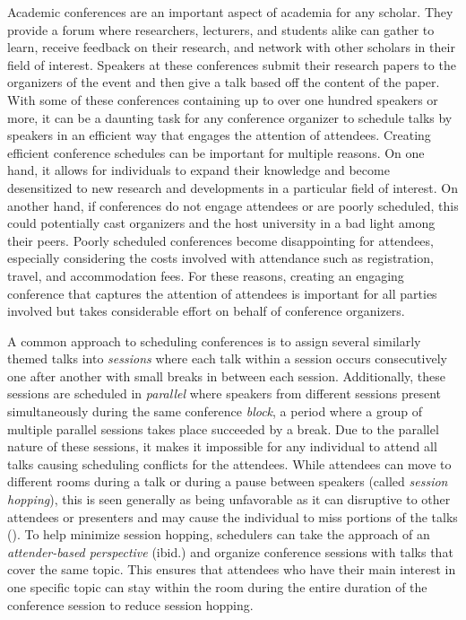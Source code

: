 \documentclass[a4paper, 12pt, twoside]{article}
\numberwithin{equation}{section} %
\begin{document}
Academic conferences are an important aspect of academia for any scholar. They provide a forum where researchers, lecturers, and students alike can gather to learn, receive feedback on their research, and network with other scholars in their field of interest. Speakers at these conferences submit their research papers to the organizers of the event and then give a talk based off the content of the paper. With some of these conferences containing up to over one hundred speakers or more, it can be a daunting task for any conference organizer to schedule talks by speakers in an efficient way that engages the attention of attendees. Creating efficient conference schedules can be important for multiple reasons. On one hand, it allows for individuals to expand their knowledge and become desensitized to new research and developments in a particular field of interest. On another hand, if conferences do not engage attendees or are poorly scheduled, this could potentially cast organizers and the host university in a bad light among their peers. Poorly scheduled conferences become disappointing for attendees, especially considering the costs involved with attendance such as registration, travel, and accommodation fees. For these reasons, creating an engaging conference that captures the attention of attendees is important for all parties involved but takes considerable effort on behalf of conference organizers.

A common approach to scheduling conferences is to assign several similarly themed talks into \textit{sessions} where each talk within a session occurs consecutively one after another with small breaks in between each session. Additionally, these sessions are scheduled in \textit{parallel} where speakers from different sessions present simultaneously during the same conference \textit{block}, a period where a group of multiple parallel sessions takes place succeeded by a break. Due to the parallel nature of these sessions, it makes it impossible for any individual to attend all talks causing scheduling conflicts for the attendees. While attendees can move to different rooms during a talk or during a pause between speakers (called \textit{session hopping}), this is seen generally as being unfavorable as it can disruptive to other attendees or presenters and may cause the individual to miss portions of the talks (\cite{vangerven2017}). To help minimize session hopping, schedulers can take the approach of an \textit{attender-based perspective} (ibid.) and organize conference sessions with talks that cover the same topic. This ensures that attendees who have their main interest in one specific topic can stay within the room during the entire duration of the conference session to reduce session hopping.
\end{document}
